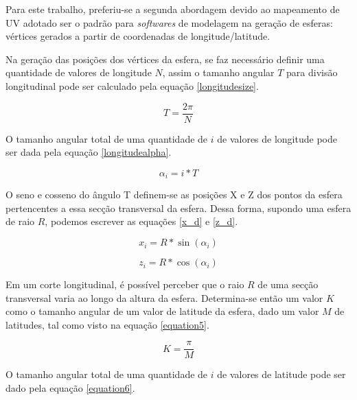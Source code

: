 \documentclass[conference]{IEEEtran}
\begin{document}
Para este trabalho, preferiu-se a segunda abordagem devido ao mapeamento de UV adotado ser o padrão para \textit{softwares} de modelagem na geração de esferas: vértices gerados a partir de coordenadas de longitude/latitude.

Na geração das posições dos vértices da esfera, se faz necessário definir uma quantidade de valores de longitude $N$, assim o tamanho angular $T$ para divisão longitudinal pode ser calculado pela equação \ref{longitudesize}.

\begin{equation}
T = \frac{2 \pi}{N}
\label{longitudesize}
\end{equation}

O tamanho angular total de uma quantidade de $i$ de valores de longitude pode ser dada pela equação \ref{longitudealpha}.

\begin{equation}
\alpha_{i} = i * T
\label{longitudealpha}
\end{equation}

O seno e cosseno do ângulo T definem-se as posições X e Z dos pontos da esfera pertencentes a essa secção transversal da esfera. Dessa forma, supondo uma esfera de raio $R$, podemos escrever as equações \ref{x_d} e \ref{z_d}.

\begin{equation}
x_{i} = R * \sin(\alpha_{i})
\label{x_d}
\end{equation}

\begin{equation}
z_{i} = R * \cos(\alpha_{i})
\label{z_d}
\end{equation}

Em um corte longitudinal, é possível perceber que o raio $R$ de uma secção transversal varia ao longo da altura da esfera. Determina-se então um valor $K$ como o tamanho angular de um valor de latitude da esfera, dado um valor $M$ de latitudes, tal como visto na equação \ref{equation5}.

\begin{equation}
K = \frac{\pi}{M}
\label{equation5}
\end{equation}

O tamanho angular total de uma quantidade de $i$ de valores de latitude pode ser dado pela equação \ref{equation6}.
\end{document}
